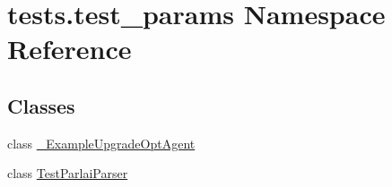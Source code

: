 \hypertarget{namespacetests_1_1test__params}{}\section{tests.\+test\+\_\+params Namespace Reference}
\label{namespacetests_1_1test__params}
\subsection*{Classes}
\begin{DoxyCompactItemize}
\item 
class \hyperlink{classtests_1_1test__params_1_1__ExampleUpgradeOptAgent}{\+\_\+\+Example\+Upgrade\+Opt\+Agent}
\item 
class \hyperlink{classtests_1_1test__params_1_1TestParlaiParser}{Test\+Parlai\+Parser}
\end{DoxyCompactItemize}

